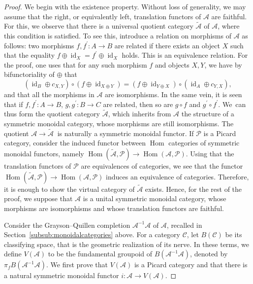 \documentclass[JEP,XML,SOM,Unicode,published]{cedram}
\theoremstyle{plain}
\theoremstyle{definition}
\newcommand{\Acal}{\mathcal A}
\newcommand{\Ccal}{\mathcal C}
\newcommand{\Pcal}{\mathcal P}
\DeclareMathOperator{\Hom}{Hom}
\DeclareMathOperator{\id}{id}
\begin{document}
\begin{proof}
We begin with the existence property. Without loss of generality, we may assume that the right, or equivalently left, translation functors of $\Acal$ are faithful. For this, we observe that there is a universal quotient category $\widetilde{\Acal}$ of $\Acal$, where this condition is satisfied. To see this, introduce a relation on morphisms of $\Acal$ as follows: two morphisms $f,f^{\prime}\colon A\to B$ are related if there exists an object $X$ such that the equality $f\oplus\id_{X}=f^{\prime}\oplus\id_{X}$ holds. This is an equivalence relation. For the proof, one uses that for any such morphism $f$ and objects $X,Y$, we have by bifunctoriality of $\oplus$ that
\begin{displaymath}
(\id_{B}\oplus c_{X,Y})\circ (f\oplus\id_{X\oplus Y})=(f\oplus\id_{Y\oplus X})\circ (\id_{A}\oplus c_{Y,X}),
\end{displaymath}
and that all the morphisms in $\Acal$ are isomorphisms. In the same vein, it is seen that if $f, f^{\prime}\colon A\to B$, \resp $g,g^{\prime}\colon B\to C$ are related, then so are $g\circ f$ and $g^{\prime}\circ f^{\prime}$. We~can thus form the quotient category $\widetilde{\Acal}$, which inherits from $\Acal$ the structure of a symmetric monoidal category, whose morphisms are still isomorphisms. The quotient $\Acal\to\widetilde{\Acal}\ $ is naturally a symmetric monoidal functor. If $\Pcal$ is a Picard category, consider the induced functor between $\Hom$ categories of symmetric monoidal functors, namely $\Hom(\widetilde{\Acal},\Pcal)\to\Hom(\Acal,\Pcal)$. Using that the translation functors of $\Pcal$ are equivalences of categories, we see that the functor $\Hom(\widetilde{\Acal},\Pcal)\to\Hom(\Acal,\Pcal)$ induces an equivalence of categories. Therefore, it is enough to show the virtual category of $\widetilde{\Acal}$ exists. Hence, for the rest of the proof, we suppose that $\Acal$ is a unital symmetric monoidal category, whose morphisms are isomorphisms and whose translation functors are faithful.

Consider the Grayson--Quillen completion $\Acal^{-1} \Acal$ of $\Acal$, recalled in Section~\ref{subsub:monoidalcategories} above. For a category $\Ccal$, let $B(\Ccal)$ be its classifying space, that is the geometric realization of its nerve. In these terms, we define $V(\Acal)$ to be the fundamental groupoid of $B(\Acal^{-1} \Acal)$, denoted by $\pi_{f}B(\Acal^{-1} \Acal)$. We first prove that $V(\Acal)$ is a Picard category and that there is a natural symmetric monoidal functor $i: \Acal \to V(\Acal)$.


\end{proof}
\end{document}
